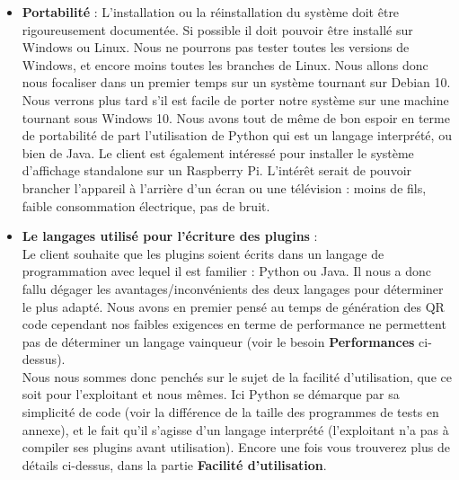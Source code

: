 \documentclass[a4paper,12pt]{article}
\begin{document}
\begin{itemize}
  Ici, le choix du langage a également son importance. Java possède des mots-clés puissant comme final ou private, ainsi qu'un typage fort. Python lui propose plutôt des manières pour indiquer que des attributs sont privés, sans réelles protections. Au moyen de techniques comme la "décoration de nom" ou Name mangling\footnote{Source : \url{https://en.wikipedia.org/wiki/Name_mangling} (consulté le 12/02/2021)} en anglais, il est possible d'accéder et même de modifier des attributs "privés".
  Le langage Java paraît donc le plus approprié pour limiter les capacités d'un plugin à "casser" le système.\\
  
  \item \textbf{Portabilité} : L'installation ou la réinstallation du système doit être rigoureusement documentée. Si possible il doit pouvoir être installé sur Windows ou Linux. Nous ne pourrons pas tester toutes les versions de Windows, et encore moins toutes les branches de Linux. Nous allons donc nous focaliser dans un premier temps sur un système tournant sur Debian 10. Nous verrons plus tard s'il est facile de porter notre système sur une machine tournant sous Windows 10. Nous avons tout de même de bon espoir en terme de portabilité de part l'utilisation de Python qui est un langage interprété, ou bien de Java. Le client est également intéressé pour installer le système d'affichage standalone sur un Raspberry Pi. L'intérêt serait de pouvoir brancher l'appareil à l'arrière d'un écran ou une télévision : moins de fils, faible consommation électrique, pas de bruit.\\
  
  \item \textbf{Le langages utilisé pour l'écriture des plugins} :\\
  Le client souhaite que les plugins soient écrits dans un langage de programmation avec lequel il est familier : Python ou Java.
  Il nous a donc fallu dégager les avantages/inconvénients des deux langages pour déterminer le plus adapté. Nous avons en premier pensé au temps de génération des QR code cependant nos faibles exigences en terme de performance ne permettent pas de déterminer un langage vainqueur (voir le besoin \textbf{Performances} ci-dessus).\\
  
  Nous nous sommes donc penchés sur le sujet de la facilité d'utilisation, que ce soit pour l'exploitant et nous mêmes. Ici Python se démarque par sa simplicité de code (voir la différence de la taille des programmes de tests en annexe), et le fait qu'il s'agisse d'un langage interprété (l'exploitant n'a pas à compiler ses plugins avant utilisation). Encore une fois vous trouverez plus de détails ci-dessus, dans la partie \textbf{Facilité d'utilisation}.\\
  

\end{itemize}
\end{document}
